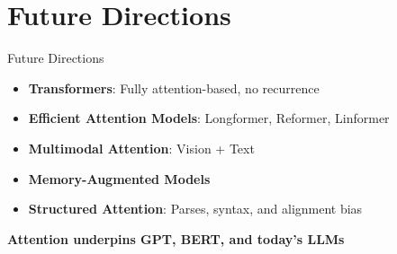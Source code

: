 \section{Future Directions}
\begin{frame}{Future Directions}
  \begin{itemize}
    \item[$\blacktriangleright$] \textbf{Transformers}: Fully attention-based, no recurrence
    \item[$\blacktriangleright$] \textbf{Efficient Attention Models}: Longformer, Reformer, Linformer
    \item[$\blacktriangleright$] \textbf{Multimodal Attention}: Vision + Text
    \item[$\blacktriangleright$] \textbf{Memory-Augmented Models}
    \item[$\blacktriangleright$] \textbf{Structured Attention}: Parses, syntax, and alignment bias
  \end{itemize}
  \vspace{1em}
  \textbf{Attention underpins GPT, BERT, and today's LLMs}
\end{frame}
